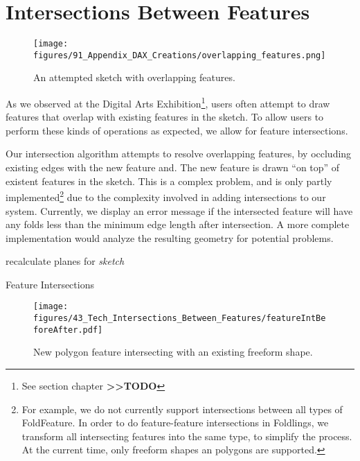 \section{Intersections Between
Features}\label{intersections-between-features}

\begin{figure}[htbp]
\centering
\texttt{[image: figures/91\_Appendix\_DAX\_Creations/overlapping\_features.png]}
\caption{An attempted sketch with overlapping features.}
\end{figure}

As we observed at the Digital Arts Exhibition\footnote{See section
  chapter \textbf{\textgreater{}\textgreater{}TODO}}, users often
attempt to draw features that overlap with existing features in the
sketch. To allow users to perform these kinds of operations as expected,
we allow for feature intersections.

Our intersection algorithm attempts to resolve overlapping features, by
occluding existing edges with the new feature and. The new feature is
drawn ``on top'' of existent features in the sketch. This is a complex
problem, and is only partly implemented\footnote{For example, we do not
  currently support intersections between all types of FoldFeature. In
  order to do feature-feature intersections in Foldlings, we transform
  all intersecting features into the same type, to simplify the process.
  At the current time, only freeform shapes an polygons are supported.}
due to the complexity involved in adding intersections to our system.
Currently, we display an error message if the intersected feature will
have any folds less than the minimum edge length after intersection. A
more complete implementation would analyze the resulting geometry for
potential problems.

\begin{algorithm}[H]

recalculate planes for \textit{sketch}
\
\
\caption{Feature Intersections}
\end{algorithm}

\begin{figure}[htbp]
\centering
\texttt{[image: figures/43\_Tech\_Intersections\_Between\_Features/featureIntBeforeAfter.pdf]}
\caption{New polygon feature intersecting with an existing freeform
shape.}
\end{figure}
